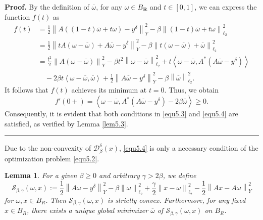 \documentclass[a4paper,12pt]{article}
\newtheorem{lemma}[theorem]{Lemma}
\numberwithin{equation}{section}
\newenvironment{proof}[1][Proof]{\textbf{#1.} }
{\ \rule{0.75em}{0.75em}\smallskip}
\begin{document}
\begin{proof}
    By the definition of $\overline{\omega}$, for any $\omega\in B_{\mathbf{R}}$ and $t\in[0,1]$, we can express the function $f\left(t\right)$ as
    \begin{align*}
        f\left(t\right)
    & =\frac{1}{2}\left\|A\left(\left(1-t\right)\overline{\omega} +t\omega\right)-y^{\delta}\right\|_{Y}^{2}-\beta\left\|\left(1-t\right)\overline{\omega} +t\omega\right\|_{\ell_{2}}^{2} \nonumber\\
    & =\frac{1}{2}\left\|tA\left(\omega-\overline{\omega}\right)+A\overline{\omega} -y^{\delta}\right\|_{Y}^{2}-\beta\left\|t\left(\omega-\overline{\omega}\right) +\overline{\omega} \right\|_{\ell_{2}}^{2} \nonumber\\
    & =\frac{t^{2}}{2}\left\|A\left(\omega-\overline{\omega}\right)\right\|_{Y}^{2} -\beta t^{2}\left\|\omega-\overline{\omega}\right\|_{\ell_{2}}^{2}+ t\left<\omega-\overline{\omega},A^{*}\left(A\overline{\omega}-y^{\delta}\right)\right> \nonumber\\
    & \quad -2\beta t\left<\omega-\overline{\omega}, \overline{\omega}\right> +\frac{1}{2}\left\|A\overline{\omega}-y^{\delta}\right\|_{Y}^{2}- \beta\left\|\overline{\omega}\right\|_{\ell_{2}}^{2}.
    \end{align*} 
    It follows that $f\left(t\right)$ achieves its minimum at $t=0$. Thus, we obtain
    \begin{equation*}
        f'\left(0+\right)=\left<\omega-\overline{\omega},A^{*}\left(A\overline{\omega} -y^{\delta}\right)-2\beta\overline{\omega}\right>\geq 0.
    \end{equation*}
    Consequently, it is evident that both conditions in \eqref{equ5.3} and \eqref{equ5.4} are satisfied, as verified by Lemma \ref{lem5.3}.
\end{proof}

\par Due to the non-convexity of $\mathcal{D}_{\beta}^{\delta}\left(x\right)$, \eqref{equ5.4} is only a necessary condition of the optimization problem \eqref{equ5.2}.

\begin{lemma}\label{lem5.4}
    For a given $\beta\geq 0$ and arbitrary $\gamma>2\beta$, we define
    \begin{equation}\label{equ5.5}
        \mathcal{S}_{\beta,\gamma}(\omega,x):=\frac{1}{2}\left\|A\omega-y^{\delta}\right\|_{Y}^{2}- \beta\left\|\omega\right\|_{\ell_{2}}^{2} +\frac{\gamma}{2}\left\|x-\omega\right\|_{\ell_{2}}^{2} -\frac{1}{2}\left\|Ax-A\omega\right\|_{Y}^{2}
    \end{equation}
    for $\omega, x\in B_{R}$. Then $\mathcal{S}_{\beta,\gamma}(\omega,x)$ is strictly convex. Furthermore, for any fixed $x\in B_{R}$, there exists a unique global minimizer $\overline{\omega}$ of $\mathcal{S}_{\beta,\gamma}(\omega,x)$ on $B_{R}$.
\end{lemma}
\end{document}
